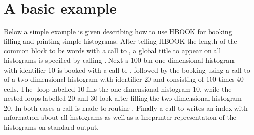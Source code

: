 \finalnewpage

\section{A basic example}
\label{HSIMPLEXA}

Below a simple example is given describing 
how to use HBOOK for booking, filling and printing simple histograms.
After telling HBOOK the length of the  common block
to be  words with a call to , a 
global title to appear on all histograms is specified by calling
. 
Next a 100 bin one-dimensional histogram with identifier 10 is booked 
with a call to , followed by the booking 
using a call to  of a two-dimensional histogram with identifier 20 
and consisting of 100 times 40 cells.
The -loop labelled 10 fills the one-dimensional histogram 10,
while the nested  loops labelled 20 and 30 look after filling
the two-dimensional histogram 20. 
In both cases a call is made to routine .
Finally a call to  writes an index with information 
about all histograms as well as a lineprinter representation of
the histograms on standard output.

